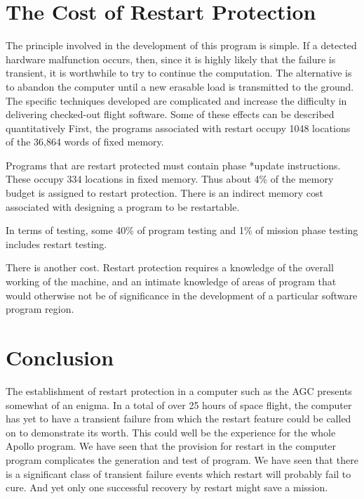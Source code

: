 \documentclass[oxford]{ahsan}
\begin{document}
\section{The Cost of Restart Protection}

The principle involved in the development of this program is simple. If a detected
hardware malfunction occurs, then, since it is highly likely that the failure is
transient, it is worthwhile to try to continue the computation. The alternative is to
abandon the computer until a new erasable load is transmitted to the ground. The
specific techniques developed are complicated and increase the difficulty in
delivering checked-out flight software. Some of these effects can be described
quantitatively First, the programs associated with restart occupy 1048 locations of
the 36,864 words of fixed memory.

Programs that are restart protected must contain phase *update  instructions. These
occupy 334 locations in fixed memory. Thus about 4\% of the memory budget is assigned to
restart protection. There is an indirect memory cost associated with designing a
program to be restartable.

In terms of testing, some 40\% of program testing and 1\% of mission phase testing
includes restart testing.

There is another cost. Restart protection requires a knowledge of the overall working
of the machine, and an intimate knowledge of areas of program that would otherwise not
be of significance in the development of a particular software program region.


\section{Conclusion}

The establishment of restart protection in a computer such as  the AGC presents somewhat
of an enigma. In a total of over 25 hours of space flight, the computer has yet to have
a transient failure from which the restart feature could be called on to demonstrate
its worth. This could well be the experience for the whole  Apollo program. We have seen
that the provision for restart in the computer program complicates the generation and
test of program. We have seen that there is a significant class of transient failure
events which restart will probably fail to cure. And yet only one successful recovery
by restart might save a mission.
\end{document}

